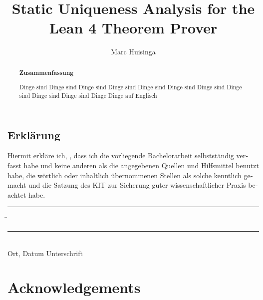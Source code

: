 \documentclass[parskip=full,12pt,a4paper,twoside,headings=openright, fleqn]{scrreprt}
\title{Static Uniqueness Analysis for the Lean 4 Theorem Prover}
\author{Marc Huisinga}
\begin{document}
\begin{otherlanguage}{ngerman} %
\mytitlepage
\end{otherlanguage}

\begin{abstract}
\begin{center}\Huge\textbf{\textsf{Zusammenfassung}}
\end{center}
\vfill

Dinge sind Dinge sind Dinge sind Dinge sind Dinge sind Dinge sind Dinge sind Dinge sind Dinge sind Dinge sind Dinge
\vfill
Dinge auf Englisch
\vfill
\end{abstract}

\tableofcontents













\begin{otherlanguage}{ngerman}
\chapter*{Erklärung}
\pagestyle{empty}

  \vspace{20mm}
  Hiermit erkläre ich, \theauthor, dass ich die vorliegende Bachelorarbeit selbst\-ständig
verfasst habe und keine anderen als die angegebenen Quellen und Hilfsmittel
benutzt habe, die wörtlich oder inhaltlich übernommenen Stellen als solche kenntlich gemacht und
die Satzung des KIT zur Sicherung guter wissenschaftlicher Praxis beachtet habe.
  \vspace{20mm}
  \begin{tabbing}
  \rule{7cm}{.4pt}\hspace{1cm} \= \rule{6.8cm}{.4pt} \\
 Ort, Datum \> Unterschrift
  \end{tabbing}
\end{otherlanguage}

\chapter*{Acknowledgements}
\pagestyle{empty}

\pagestyle{fancy}
\appendix


\end{document}
